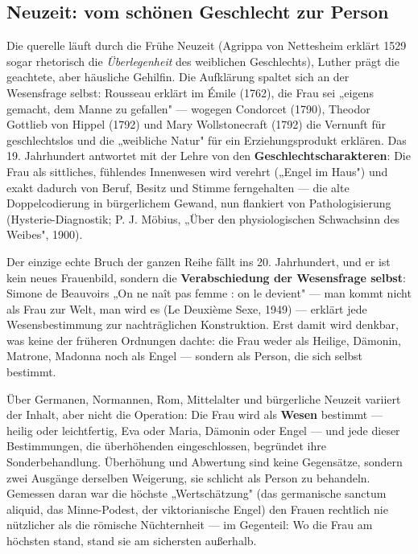 \documentclass[11pt,a4paper,ngerman]{scrartcl}
\newcommand{\chipbase}[2]{\hspace{0pt}{\footnotesize\textcolor{#1}{[\textsc{#2}]}}}
\newcommand{\chipbelegt}[1]{\chipbase{chipgreen}{#1}}
\newcommand{\chipplausibel}[1]{\chipbase{chipamber}{#1}}
\newenvironment{callout}[2]{%
  \def\FrameCommand{{\color{#1}\vrule width 2pt}\hspace{8pt}}%
  \MakeFramed{\advance\hsize-\width\FrameRestore}%
  \noindent{\small\scshape\color{#1}#2}\par\smallskip\small
}{\endMakeFramed\medskip}
\begin{document}
\subsection*{Neuzeit: vom schönen Geschlecht zur Person}

Die querelle läuft durch die Frühe Neuzeit (Agrippa von Nettesheim erklärt 1529 sogar rhetorisch die \emph{Überlegenheit} des weiblichen Geschlechts), Luther prägt die geachtete, aber häusliche Gehilfin. Die Aufklärung spaltet sich an der Wesensfrage selbst: Rousseau erklärt im Émile (1762), die Frau sei „eigens gemacht, dem Manne zu gefallen" — wogegen Condorcet (1790), Theodor Gottlieb von Hippel (1792) und Mary Wollstonecraft (1792) die Vernunft für geschlechtslos und die „weibliche Natur" für ein Erziehungsprodukt erklären. Das 19. Jahrhundert antwortet mit der Lehre von den \textbf{Geschlechtscharakteren}: Die Frau als sittliches, fühlendes Innenwesen wird verehrt („Engel im Haus") und exakt dadurch von Beruf, Besitz und Stimme ferngehalten — die alte Doppelcodierung in bürgerlichem Gewand, nun flankiert von Pathologisierung (Hysterie-Diagnostik; P. J. Möbius, „Über den physiologischen Schwachsinn des Weibes", 1900). \chipbelegt{belegt}

Der einzige echte Bruch der ganzen Reihe fällt ins 20. Jahrhundert, und er ist kein neues Frauenbild, sondern die \textbf{Verabschiedung der Wesensfrage selbst}: Simone de Beauvoirs „On ne naît pas femme : on le devient" — man kommt nicht als Frau zur Welt, man wird es (Le Deuxième Sexe, 1949) — erklärt jede Wesensbestimmung zur nachträglichen Konstruktion. Erst damit wird denkbar, was keine der früheren Ordnungen dachte: die Frau weder als Heilige, Dämonin, Matrone, Madonna noch als Engel — sondern als Person, die sich selbst bestimmt. \chipbelegt{belegt}

\begin{callout}{gold}{Die Konstante}
Über Germanen, Normannen, Rom, Mittelalter und bürgerliche Neuzeit variiert der Inhalt, aber nicht die Operation: Die Frau wird als \textbf{Wesen} bestimmt — heilig oder leichtfertig, Eva oder Maria, Dämonin oder Engel — und jede dieser Bestimmungen, die überhöhenden eingeschlossen, begründet ihre Sonderbehandlung. Überhöhung und Abwertung sind keine Gegensätze, sondern zwei Ausgänge derselben Weigerung, sie schlicht als Person zu behandeln. Gemessen daran war die höchste „Wertschätzung" (das germanische sanctum aliquid, das Minne-Podest, der viktorianische Engel) den Frauen rechtlich nie nützlicher als die römische Nüchternheit — im Gegenteil: Wo die Frau am höchsten stand, stand sie am sichersten außerhalb. \chipplausibel{plausibel}
\end{callout}
\end{document}
